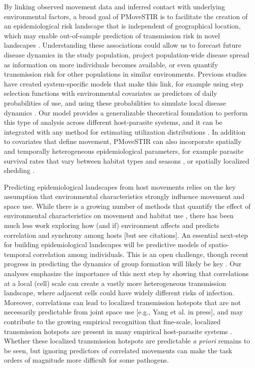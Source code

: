 \documentclass[letterpaper]{article}
\begin{document}
By linking observed movement data and inferred contact with underlying environmental factors, a broad goal of PMoveSTIR is to facilitate the creation of an epidemiological risk landscape that is independent of geographical location, which may enable out-of-sample prediction of transmission risk in novel landscapes \citep{Manlove2022}. Understanding these associations could allow us to forecast future disease dynamics in the study population, project population-wide disease spread as information on more individuals becomes available, or even quantify transmission risk for other populations in similar environments. Previous studies have created system-specific models that make this link, for example using step selection functions with environmental covariates as predictors of daily probabilities of use, and using these probabilities to simulate local disease dynamics \citep{Merkle2018}. Our model provides a generalizable theoretical foundation to perform this type of analysis across different host-parasite systems, and it can be integrated with any method for estimating utilization distributions \citep{Signer2017,Merkle2018,Michelot2020,Potts2023}. In addition to covariates that define movement, PMoveSTIR can also incorporate spatially and temporally heterogeneous epidemiological parameters, for example parasite survival rates that vary between habitat types and seasons \citep{Daversa2017}, or spatially localized shedding \citep{Weinstein2018a}. 

Predicting epidemiological landscapes from host movements relies on the key assumption that environmental characteristics strongly influence movement and space use. While there is a growing number of methods that quantify the effect of environmental characteristics on movement and habitat use \citep[reviewed in][]{Hooten2017a}, there has been much less work exploring how (and if) environment affects and predicts correlation and synchrony among hosts [but see citations].  An essential next-step for building epidemiological landscapes will be predictive models of spatio-temporal correlation among individuals.  This is an open challenge, though recent progress in predicting the dynamics of group formation will likely be key \citep[e.g.][]{Brandell2021}.
Our analyses emphasize the importance of this next step by showing that correlations at a local (cell) scale can create a vastly more heterogeneous transmission landscape, where adjacent cells could have widely different risks of infection.  Moreover, correlations can lead to localized transmission hotspots that are not necessarily predictable from joint space use [e.g., Yang et al. in press], and may contribute to the growing empirical recognition that fine-scale, localized transmission hotspots are present in many empirical host-parasite systems \citep{Albery2021}.  Whether these localized transmission hotspots are predictable \emph{a priori} remains to be seen, but ignoring predictors of correlated movements can make the task orders of magnitude more difficult for some pathogens.
\end{document}
